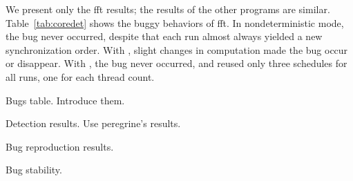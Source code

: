 We present only the fft results; the results of the other programs are
similar.  Table~\ref{tab:coredet} shows the buggy behaviors of fft.
  In nondeterministic mode, the bug never
occurred, despite that each run almost always yielded a new
synchronization order. With \coredet, slight changes in computation made the
bug occur or disappear.  With \tern, the bug never occurred, and
\tern reused only three schedules for all runs, one for each
thread count.  

Bugs table. Introduce them.

Detection results. Use peregrine's results.

Bug reproduction results.

Bug stability.
